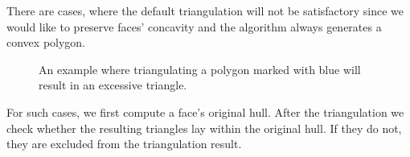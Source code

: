There are cases, where the default triangulation will not be satisfactory
since we would like to preserve faces' concavity and the algorithm always generates a convex polygon.

\begin{figure}[H]
	\caption{An example where triangulating a polygon marked with blue will result in an excessive triangle.}
	\centering
	\qquad\qquad\qquad
	\qquad
\end{figure}

For such cases, we first compute a face's original hull. After the triangulation we check whether the resulting triangles
lay within the original hull. If they do not, they are excluded from the triangulation result.

